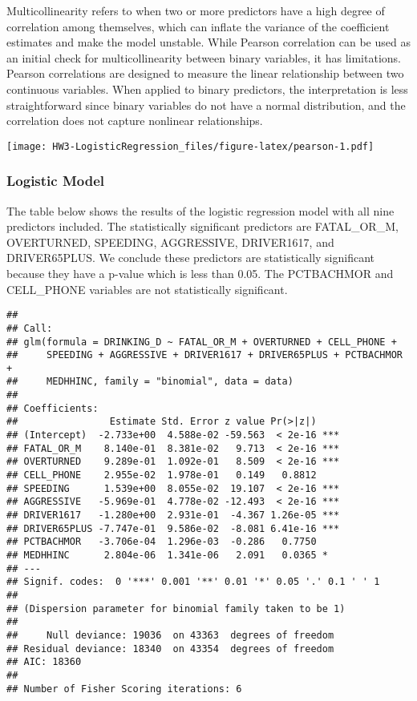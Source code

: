 \documentclass[
]{article}
\begin{document}
Multicollinearity refers to when two or more predictors have a high
degree of correlation among themselves, which can inflate the variance
of the coefficient estimates and make the model unstable. While Pearson
correlation can be used as an initial check for multicollinearity
between binary variables, it has limitations. Pearson correlations are
designed to measure the linear relationship between two continuous
variables. When applied to binary predictors, the interpretation is less
straightforward since binary variables do not have a normal
distribution, and the correlation does not capture nonlinear
relationships.

\texttt{[image: HW3-LogisticRegression\_files/figure-latex/pearson-1.pdf]}

\hypertarget{logistic-model}{%
\subsubsection{Logistic Model}\label{logistic-model}}

The table below shows the results of the logistic regression model with
all nine predictors included. The statistically significant predictors
are FATAL\_OR\_M, OVERTURNED, SPEEDING, AGGRESSIVE, DRIVER1617, and
DRIVER65PLUS. We conclude these predictors are statistically significant
because they have a p-value which is less than 0.05. The PCTBACHMOR and
CELL\_PHONE variables are not statistically significant.

\begin{verbatim}
## 
## Call:
## glm(formula = DRINKING_D ~ FATAL_OR_M + OVERTURNED + CELL_PHONE + 
##     SPEEDING + AGGRESSIVE + DRIVER1617 + DRIVER65PLUS + PCTBACHMOR + 
##     MEDHHINC, family = "binomial", data = data)
## 
## Coefficients:
##                Estimate Std. Error z value Pr(>|z|)    
## (Intercept)  -2.733e+00  4.588e-02 -59.563  < 2e-16 ***
## FATAL_OR_M    8.140e-01  8.381e-02   9.713  < 2e-16 ***
## OVERTURNED    9.289e-01  1.092e-01   8.509  < 2e-16 ***
## CELL_PHONE    2.955e-02  1.978e-01   0.149   0.8812    
## SPEEDING      1.539e+00  8.055e-02  19.107  < 2e-16 ***
## AGGRESSIVE   -5.969e-01  4.778e-02 -12.493  < 2e-16 ***
## DRIVER1617   -1.280e+00  2.931e-01  -4.367 1.26e-05 ***
## DRIVER65PLUS -7.747e-01  9.586e-02  -8.081 6.41e-16 ***
## PCTBACHMOR   -3.706e-04  1.296e-03  -0.286   0.7750    
## MEDHHINC      2.804e-06  1.341e-06   2.091   0.0365 *  
## ---
## Signif. codes:  0 '***' 0.001 '**' 0.01 '*' 0.05 '.' 0.1 ' ' 1
## 
## (Dispersion parameter for binomial family taken to be 1)
## 
##     Null deviance: 19036  on 43363  degrees of freedom
## Residual deviance: 18340  on 43354  degrees of freedom
## AIC: 18360
## 
## Number of Fisher Scoring iterations: 6
\end{verbatim}
\end{document}
